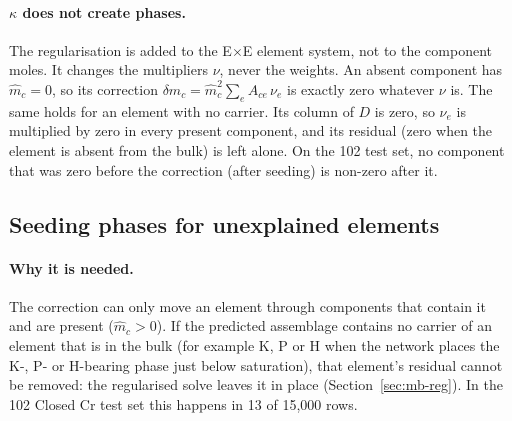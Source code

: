 \documentclass[11pt]{article}
\begin{document}
\paragraph{$\kappa$ does not create phases.} The regularisation is added to the
E$\times$E element system, not to the component moles. It changes the multipliers $\nu$,
never the weights. An absent component has $\hat m_c = 0$, so its correction
$\delta\hat m_c = \hat m_c^2 \sum_e A_{ce}\,\nu_e$ is exactly zero whatever $\nu$ is. The
same holds for an element with no carrier. Its column of $D$ is zero, so $\nu_e$ is
multiplied by zero in every present component, and its residual (zero when the element is
absent from the bulk) is left alone. On the 102 test set, no component that was zero before
the correction (after seeding) is non-zero after it.

\subsection{Seeding phases for unexplained elements}
\label{sec:seed}

\paragraph{Why it is needed.} The correction can only move an element through components
that contain it and are present ($\hat m_c > 0$). If the predicted assemblage contains no
carrier of an element that is in the bulk (for example K, P or H when the network places
the K-, P- or H-bearing phase just below saturation), that element's residual cannot be
removed: the regularised solve leaves it in place (Section~\ref{sec:mb-reg}). In the 102
Closed Cr test set this happens in 13 of 15{,}000 rows.
\end{document}
